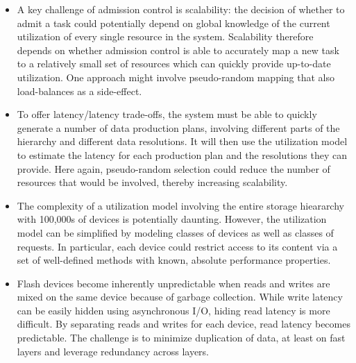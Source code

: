 \begin{itemize}

\item A key challenge of admission control is scalability: the
decision of whether to admit a task could potentially depend on
global knowledge of the current utilization of every single resource
in the system. Scalability therefore depends on whether admission
control is able to accurately map a new task to a relatively small
set of resources which can quickly provide up-to-date utilization.
One approach might involve pseudo-random mapping that also load-balances
as a side-effect.

\item To offer latency/latency trade-offs, the system must be able
to quickly generate a number of data production plans, involving
different parts of the hierarchy and different data resolutions.
It will then use the utilization model to estimate the latency for
each production plan and the resolutions they can provide. Here
again, pseudo-random selection could reduce the number of resources
that would be involved, thereby increasing scalability.

\item The complexity of a utilization model involving the entire
storage hieararchy with 100,000s of devices is potentially daunting.
However, the utilization model can be simplified by modeling classes
of devices as well as classes of requests. In particular, each
device could restrict access to its content via a set of well-defined
methods with known, absolute performance properties.

\item Flash devices become inherently unpredictable when reads and
writes are mixed on the same device because of garbage collection.
While write latency can be easily hidden using asynchronous I/O,
hiding read latency is more difficult. By separating reads and
writes for each device, read latency becomes predictable. The
challenge is to minimize duplication of data, at least on fast
layers and leverage redundancy across layers.

\end{itemize}



